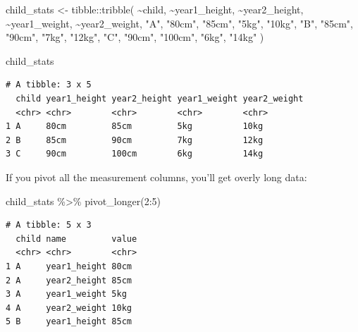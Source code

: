 \documentclass[
  letterpaper,
  DIV=11,
  numbers=noendperiod]{scrreprt}
\newenvironment{Shaded}{\begin{snugshade}}{\end{snugshade}}
\newcommand{\DecValTok}[1]{\textcolor[rgb]{0.68,0.00,0.00}{#1}}
\newcommand{\FunctionTok}[1]{\textcolor[rgb]{0.28,0.35,0.67}{#1}}
\newcommand{\NormalTok}[1]{\textcolor[rgb]{0.00,0.23,0.31}{#1}}
\newcommand{\OtherTok}[1]{\textcolor[rgb]{0.00,0.23,0.31}{#1}}
\newcommand{\SpecialCharTok}[1]{\textcolor[rgb]{0.37,0.37,0.37}{#1}}
\newcommand{\StringTok}[1]{\textcolor[rgb]{0.13,0.47,0.30}{#1}}
\begin{document}
\begin{Shaded}
\begin{Highlighting}[]
\NormalTok{child\_stats }\OtherTok{\textless{}{-}} 
\NormalTok{  tibble}\SpecialCharTok{::}\FunctionTok{tribble}\NormalTok{(}
    \SpecialCharTok{\textasciitilde{}}\NormalTok{child, }\SpecialCharTok{\textasciitilde{}}\NormalTok{year1\_height, }\SpecialCharTok{\textasciitilde{}}\NormalTok{year2\_height, }\SpecialCharTok{\textasciitilde{}}\NormalTok{year1\_weight, }\SpecialCharTok{\textasciitilde{}}\NormalTok{year2\_weight,}
       \StringTok{"A"}\NormalTok{,        }\StringTok{"80cm"}\NormalTok{,        }\StringTok{"85cm"}\NormalTok{,         }\StringTok{"5kg"}\NormalTok{,        }\StringTok{"10kg"}\NormalTok{,}
       \StringTok{"B"}\NormalTok{,        }\StringTok{"85cm"}\NormalTok{,        }\StringTok{"90cm"}\NormalTok{,         }\StringTok{"7kg"}\NormalTok{,        }\StringTok{"12kg"}\NormalTok{,}
       \StringTok{"C"}\NormalTok{,        }\StringTok{"90cm"}\NormalTok{,       }\StringTok{"100cm"}\NormalTok{,         }\StringTok{"6kg"}\NormalTok{,        }\StringTok{"14kg"}
\NormalTok{    )}

\NormalTok{child\_stats}
\end{Highlighting}
\end{Shaded}

\begin{verbatim}
# A tibble: 3 x 5
  child year1_height year2_height year1_weight year2_weight
  <chr> <chr>        <chr>        <chr>        <chr>       
1 A     80cm         85cm         5kg          10kg        
2 B     85cm         90cm         7kg          12kg        
3 C     90cm         100cm        6kg          14kg        
\end{verbatim}

If you pivot all the measurement columns, you'll get overly long data:

\begin{Shaded}
\begin{Highlighting}[]
\NormalTok{child\_stats }\SpecialCharTok{\%\textgreater{}\%} 
  \FunctionTok{pivot\_longer}\NormalTok{(}\DecValTok{2}\SpecialCharTok{:}\DecValTok{5}\NormalTok{)}
\end{Highlighting}
\end{Shaded}

\begin{verbatim}
# A tibble: 5 x 3
  child name         value
  <chr> <chr>        <chr>
1 A     year1_height 80cm 
2 A     year2_height 85cm 
3 A     year1_weight 5kg  
4 A     year2_weight 10kg 
5 B     year1_height 85cm 
\end{verbatim}
\end{document}
